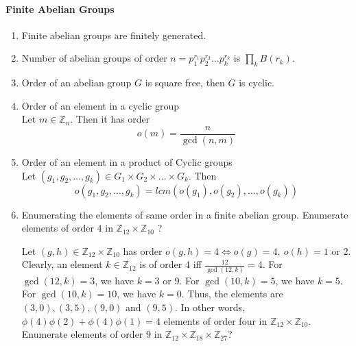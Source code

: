 \paragraph{Finite Abelian Groups}
\begin{enumerate}
	\item Finite abelian groups are finitely generated.
	\item Number of abelian groups of order $n = p_1^{r_1}p_2^{r_2}\dots p_k^{r_k}$ is $\prod_k B(r_k)$.
	\item Order of an abelian group $G$ is square free, then $G$ is cyclic.
	\item Order of an element in a cyclic group\\
	Let $m \in \mathbb{Z}_n$.
	Then it has order $$o(m) = \frac{n}{\gcd(n,m)}$$
	\item Order of an element in a product of Cyclic groups\\
	Let $(g_1,g_2,\dots,g_k) \in G_1 \times G_2 \times \dots \times G_k$. Then 
	$$o(g_1,g_2,\dots,g_k) = lcm(o(g_1),o(g_2),\dots,o(g_k))$$
	\item Enumerating the elements of same order in a finite abelian group.
	\subitem Enumerate elements of order $4$ in $\mathbb{Z}_{12} \times \mathbb{Z}_{10}$ ? 

	Let $(g,h) \in \mathbb{Z}_{12} \times \mathbb{Z}_{10}$ has order $o(g,h)= 4 \iff o(g)=4,\ o(h) = 1 \text{ or } 2$. Clearly, an element $k \in \mathbb{Z}_{12}$ is of order $4$ iff $\frac{12}{\gcd(12,k)}=4$. For $\gcd(12,k)=3$, we have $k = 3$ or $9$. For $\gcd(10,k)=5$, we have $k=5$. For $\gcd(10,k)=10$, we have $k=0$. Thus, the elements are $(3,0),(3,5),(9,0)$ and $(9,5)$.  
	In other words, $\phi(4)\phi(2)+\phi(4)\phi(1)=4$ elements of order four in $\mathbb{Z}_{12} \times \mathbb{Z}_{10}$.
	\subitem Enumerate elements of order $9$ in $\mathbb{Z}_{12} \times \mathbb{Z}_{18} \times \mathbb{Z}_{27}$?


\end{enumerate}
